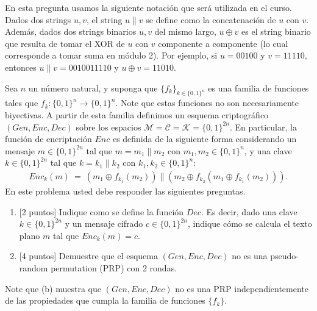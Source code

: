 En esta pregunta usamos la siguiente notación que será utilizada en el
curso. Dados dos strings $u, v$, el string $u \| v$ se define como la
concatenación de $u$ con $v$. Además, dados dos strings binarios $u,
v$ del mismo largo, $u \oplus v$ es el string binario que resulta de
tomar el XOR de $u$ con $v$ componente a componente (lo cual
corresponde a tomar suma en módulo 2). Por ejemplo, si $u = 00100$ y
$v = 11110$, entonces $u \| v = 0010011110$ y $u \oplus v = 11010$.


Sea $n$ un número natural, y suponga que $\{f_k\}_{k \in \{0,1\}^n}$
es una familia de funciones tales que $f_k
: \{0,1\}^n \to \{0,1\}^n$. Note que estas funciones no son
necesariamente biyectivas. A partir de esta familia definimos un
esquema criptográfico $(\textit{Gen}, \textit{Enc}, \textit{Dec})$
sobre los espacios $\mathcal{M} = \mathcal{C} = \mathcal{K}
= \{0,1\}^{2n}$. En particular, la función de encriptación
$\textit{Enc}$ es definida de la siguiente forma considerando un
mensaje $m \in \{0,1\}^{2n}$ tal que $m = m_1 \| m_2$ con $m_1,
m_2 \in \{0,1\}^n$, y una clave $k \in \{0,1\}^{2n}$ tal que $k =
k_1 \| k_2$ con $k_1, k_2 \in \{0,1\}^n$:
\begin{align*}
\textit{Enc}_k(m) \ = \ (m_1 \oplus f_{k_1}(m_2)) \| (m_2 \oplus f_{k_2}(m_1 \oplus f_{k_1}(m_2))). 
\end{align*}
En este problema usted debe responder las siguientes preguntas.
\begin{enumerate}
\item {[2 puntos]} Indique como se define la función $\textit{Dec}$. Es decir, dado una clave $k \in \{0,1\}^{2n}$ y un mensaje cifrado $c \in \{0,1\}^{2n}$, indique cómo se calcula el texto plano $m$ tal que $\textit{Enc}_k(m) = c$.

\item {[4 puntos]} Demuestre que el esquema $(\textit{Gen}, \textit{Enc}, \textit{Dec})$ no es una pseudo-random permutation (PRP) con 2 rondas.  
\end{enumerate}
Note que (b) muestra que $(\textit{Gen}, \textit{Enc}, \textit{Dec})$
no es una PRP independientemente de las propiedades que cumpla la
familia de funciones $\{f_k\}$.
